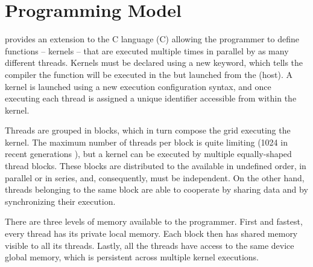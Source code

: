 \documentclass[../thesis]{subfiles}
\begin{document}
	\section{Programming Model}
	\label{sec:cuda:model}
	
	\cuda provides an extension to the C language (\cuda C) allowing the programmer to define functions -- kernels -- that are executed multiple times in parallel by as many different \cuda threads. Kernels must be declared using a new keyword, which tells the compiler the function will be executed in the \gpu but launched from the \cpu (host). A kernel is launched using a new execution configuration syntax, and once executing each thread is assigned a unique identifier accessible from within the kernel.


	Threads are grouped in blocks, which in turn compose the grid executing the kernel. The maximum number of threads per block is quite limiting (1024 in recent generations \cite{CUDA:GK110}), but a kernel can be executed by multiple equally-shaped thread blocks. These blocks are distributed to the available \sms in undefined order, in parallel or in series, and, consequently, must be independent. On the other hand, threads belonging to the same block are able to cooperate by sharing data and by synchronizing their execution.

	There are three levels of memory available to the programmer. First and fastest, every thread has its private local memory. Each block then has shared memory visible to all its threads. Lastly, all the threads have access to the same device global memory, which is persistent across multiple kernel executions.
\end{document}
